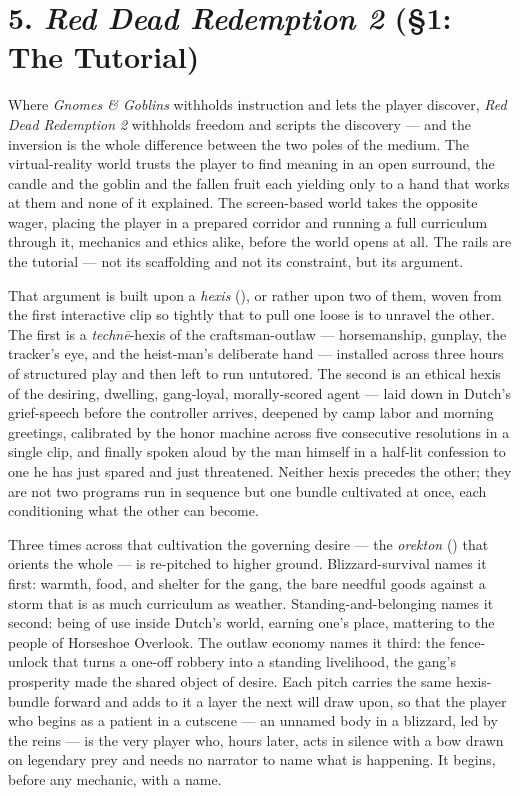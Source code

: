 \section*{5. \textit{Red Dead Redemption 2} (§1: The Tutorial)}

Where \textit{Gnomes \& Goblins} withholds instruction and lets the player discover, \textit{Red Dead Redemption 2} withholds freedom and scripts the discovery — and the inversion is the whole difference between the two poles of the medium. The virtual-reality world trusts the player to find meaning in an open surround, the candle and the goblin and the fallen fruit each yielding only to a hand that works at them and none of it explained. The screen-based world takes the opposite wager, placing the player in a prepared corridor and running a full curriculum through it, mechanics and ethics alike, before the world opens at all. The rails are the tutorial — not its scaffolding and not its constraint, but its argument.

That argument is built upon a \textit{hexis} (), or rather upon two of them, woven from the first interactive clip so tightly that to pull one loose is to unravel the other. The first is a \textit{technē}-hexis of the craftsman-outlaw — horsemanship, gunplay, the tracker's eye, and the heist-man's deliberate hand — installed across three hours of structured play and then left to run untutored. The second is an ethical hexis of the desiring, dwelling, gang-loyal, morally-scored agent — laid down in Dutch's grief-speech before the controller arrives, deepened by camp labor and morning greetings, calibrated by the honor machine across five consecutive resolutions in a single clip, and finally spoken aloud by the man himself in a half-lit confession to one he has just spared and just threatened. Neither hexis precedes the other; they are not two programs run in sequence but one bundle cultivated at once, each conditioning what the other can become.

Three times across that cultivation the governing desire — the \textit{orekton} () that orients the whole — is re-pitched to higher ground. Blizzard-survival names it first: warmth, food, and shelter for the gang, the bare needful goods against a storm that is as much curriculum as weather. Standing-and-belonging names it second: being of use inside Dutch's world, earning one's place, mattering to the people of Horseshoe Overlook. The outlaw economy names it third: the fence-unlock that turns a one-off robbery into a standing livelihood, the gang's prosperity made the shared object of desire. Each pitch carries the same hexis-bundle forward and adds to it a layer the next will draw upon, so that the player who begins as a patient in a cutscene — an unnamed body in a blizzard, led by the reins — is the very player who, hours later, acts in silence with a bow drawn on legendary prey and needs no narrator to name what is happening. It begins, before any mechanic, with a name.

